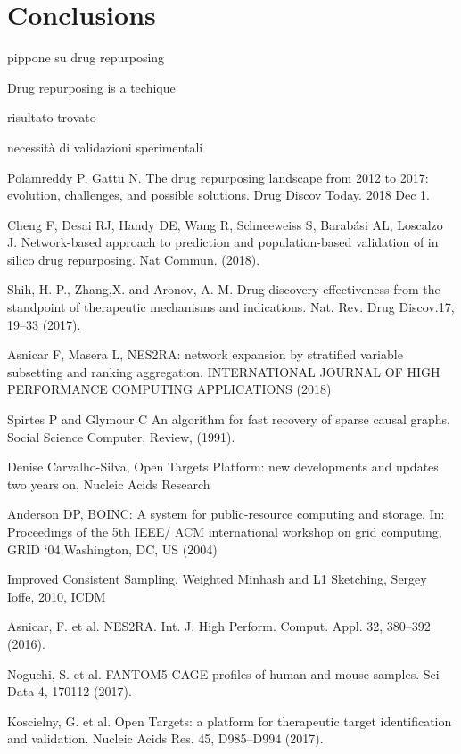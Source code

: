 \documentclass[fleqn,10pt]{SelfArx} %
\begin{document}
\section*{Conclusions}

pippone su drug repurposing

Drug repurposing is a techique 

risultato trovato

necessità di validazioni sperimentali


%
\begin{thebibliography}{1}
	
	 Polamreddy P, Gattu N. The drug repurposing landscape from 2012 to 2017: evolution, challenges, and possible solutions. Drug Discov Today. 2018 Dec 1.	
	
	 Cheng F, Desai RJ, Handy DE, Wang R, Schneeweiss S, Barabási AL, Loscalzo J. Network-based approach to prediction and population-based validation of in silico drug repurposing. Nat Commun. (2018).
	
	 Shih, H. P., Zhang,X. and Aronov, A. M. Drug discovery effectiveness from the standpoint of therapeutic mechanisms and indications. Nat. Rev. Drug Discov.17, 19–33 (2017).

	 Asnicar F, Masera L, NES2RA: network expansion by stratified variable subsetting and ranking aggregation. INTERNATIONAL JOURNAL OF HIGH PERFORMANCE COMPUTING APPLICATIONS (2018)
	
	Spirtes P and Glymour C An algorithm for fast recovery
of sparse causal graphs. Social Science Computer, Review, (1991).  

	Denise Carvalho-Silva, Open Targets Platform: new developments and updates two years on, Nucleic Acids Research 
	
	Anderson DP, BOINC: A system for public-resource computing and storage. In: Proceedings of the 5th IEEE/ ACM international workshop on grid computing, GRID ‘04,Washington, DC, US (2004)
	
	Improved Consistent Sampling, Weighted Minhash and L1 Sketching, Sergey Ioffe, 2010, ICDM
	
	 Asnicar, F. et al. NES2RA. Int. J. High Perform. Comput. Appl. 32, 380–392 (2016).
	
	
	 Noguchi, S. et al. FANTOM5 CAGE profiles of human and mouse samples. Sci Data 4, 170112 (2017).
	
	
	 Koscielny, G. et al. Open Targets: a platform for therapeutic target identification and validation. Nucleic Acids Res. 45, D985–D994 (2017).
	
	
\end{thebibliography}
\end{document}
